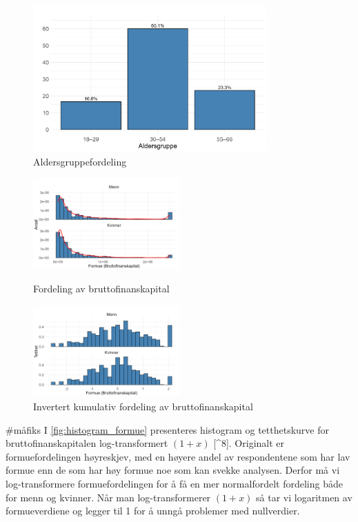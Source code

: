 \documentclass[
  12pt,
  a4paper,
  DIV=11,
  numbers=noendperiod]{scrartcl}
\begin{document}
\begin{figure}[H]
\caption{Aldersgruppefordeling}
\label{fig:barplot}
\centering
\includegraphics[width=0.8\textwidth]{dokumentobjekter/figurer/fig_3.png}
\end{figure}

\clearpage

\begin{figure} 
    \centering
    \includegraphics[width=0.5\textwidth]{dokumentobjekter/figurer/fig_4_1.png}
    \caption{Fordeling av bruttofinanskapital}
    \label{fig:histogram_formue}
    \smallskip\par
    \includegraphics[width=0.5\textwidth]{dokumentobjekter/figurer/fig_4_2.png}
    \caption{Invertert kumulativ fordeling av bruttofinanskapital}
    \label{fig:histogram_formue_fordeling}
\end{figure}

\#måfiks I \autoref{fig:histogram_formue} presenteres histogram og
tetthetskurve for bruttofinanskapitalen log-transformert \((1 + x)\)
{[}\^{}8{]}. Originalt er formuefordelingen høyreskjev, med en høyere
andel av respondentene som har lav formue enn de som har høy formue noe
som kan svekke analysen. Derfor må vi log-transformere formuefordelingen
for å få en mer normalfordelt fordeling både for menn og kvinner. Når
man log-transformerer \((1 + x)\) så tar vi logaritmen av formueverdiene
og legger til 1 for å unngå problemer med nullverdier.
\end{document}
